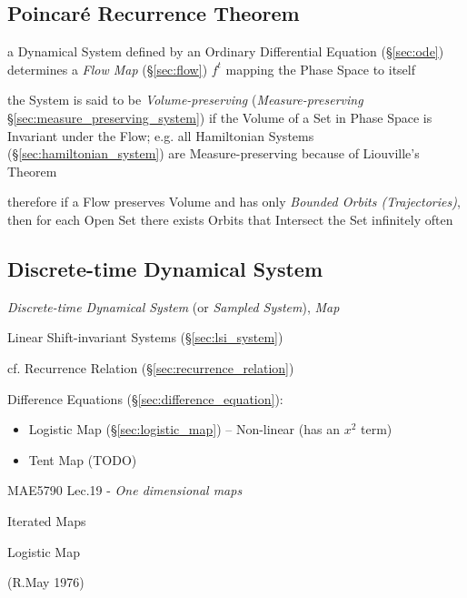 \subsection{Poincar\'e Recurrence Theorem}\label{sec:poincare_recurrence}

a Dynamical System defined by an Ordinary Differential Equation
(\S\ref{sec:ode}) determines a \emph{Flow Map} (\S\ref{sec:flow}) $f^t$ mapping
the Phase Space to itself

the System is said to be \emph{Volume-preserving} (\emph{Measure-preserving}
\S\ref{sec:measure_preserving_system}) if the Volume of a Set in Phase Space is
Invariant under the Flow;
e.g. all Hamiltonian Systems (\S\ref{sec:hamiltonian_system}) are
Measure-preserving because of Liouville's Theorem

therefore if a Flow preserves Volume and has only \emph{Bounded Orbits
  (Trajectories)}, then for each Open Set there exists Orbits that Intersect
the Set infinitely often



\subsection{Discrete-time Dynamical System}\label{sec:discrete_dynamical_system}

\emph{Discrete-time Dynamical System} (or \emph{Sampled System}), \emph{Map}

\fist Linear Shift-invariant Systems (\S\ref{sec:lsi_system})

\fist cf. Recurrence Relation (\S\ref{sec:recurrence_relation})

Difference Equations (\S\ref{sec:difference_equation}):
\begin{itemize}
  \item Logistic Map (\S\ref{sec:logistic_map}) -- Non-linear (has an $x^2$
    term)
  \item Tent Map (TODO)
\end{itemize}

MAE5790 Lec.19 - \emph{One dimensional maps}

Iterated Maps

Logistic Map

(R.May 1976)

